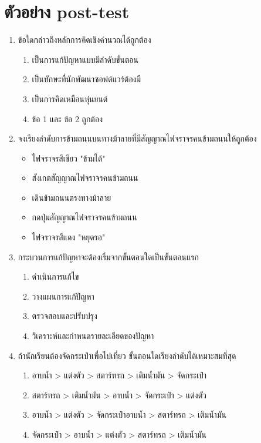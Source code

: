 \section{ตัวอย่าง post-test}
\begin{enumerate}
    \item ข้อใดกล่าวถึงหลักการคิดเชิงคำนวณได้ถูกต้อง
    \begin{enumerate}
        \item เป็นการแก้ปัญหาแบบมีลำดับขั้นตอน
        \item เป็นทักษะที่นักพัฒนาซอฟต์แวร์ต้องมี
        \item เป็นการคิดเหมือนหุ่นยนต์
        \item ข้อ 1 และ ข้อ 2 ถูกต้อง
    \end{enumerate}
    \item จงเรียงลำดับการข้ามถนนบนทางม้าลายที่มีสัญญาณไฟจราจรคนข้ามถนนให้ถูกต้อง
    \begin{itemize}
        \item ไฟจราจรสีเขียว "ข้ามได้"
        \item สังเกตสัญญาณไฟจราจรคนข้ามถนน
        \item เดินข้ามถนนตรงทางม้าลาย
        \item กดปุ่มสัญญาณไฟจราจรคนข้ามถนน
        \item ไฟจราจรสีแดง "หยุดรอ"
    \end{itemize}
    \clearpage
    \item กระบวนการแก้ปัญหาจะต้องเริ่มจากขั้นตอนใดเป็นขั้นตอนแรก
    \begin{enumerate}
        \item ดำเนินการแก้ไข
        \item วางแผนการแก้ปัญหา
        \item ตรวจสอบและปรับปรุง
        \item วิเคราะห์และกำหนดรายละเอียดของปัญหา
    \end{enumerate}
    \item ถ้านักเรียนต้องจัดกระเป๋าเพื่อไปเที่ยว ขั้นตอนใดเรียงลำดับได้เหมาะสมที่สุด
    \begin{enumerate}
        \item อาบน้ำ > แต่งตัว > สตาร์ทรถ > เติมน้ำมัน > จัดกระเป๋า
        \item สตาร์ทรถ > เติมน้ำมัน > อาบน้ำ > จัดกระเป๋า > แต่งตัว
        \item อาบน้ำ > แต่งตัว > จัดกระเป๋าอาบน้ำ > สตาร์ทรถ > เติมน้ำมัน
        \item จัดกระเป๋า > อาบน้ำ > แต่งตัว > สตาร์ทรถ > เติมน้ำมัน

\end{enumerate}
\end{enumerate}
